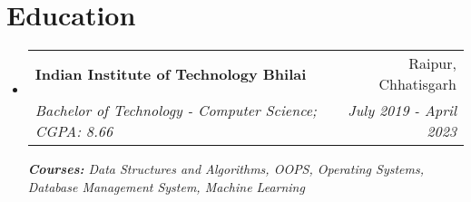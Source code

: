 \documentclass[a4paper,20pt]{article}
\makeatletter
\newcommand{\resumeSubheading}[4]{
  \vspace{-1pt}\item
    \begin{tabular*}{0.97\textwidth}{l@{\extracolsep{\fill}}r}
      \textbf{#1} & #2 \\
      \textit{#3} & \textit{#4} \\
    \end{tabular*}\vspace{-5pt}
}
\newcommand{\resumeSubHeadingListStart}{\begin{itemize}[leftmargin=*]}
\newcommand{\resumeSubHeadingListEnd}{\end{itemize}}
\makeatother
\begin{document}
\vspace{5pt}
\section{Education}
  \resumeSubHeadingListStart
    \resumeSubheading
      {Indian Institute of Technology Bhilai}{Raipur, Chhatisgarh}
      {Bachelor of Technology - Computer Science;  CGPA: 8.66}{July 2019 - April 2023}
      {\scriptsize \textit{ \footnotesize{\newline{}\textbf{Courses:}  Data Structures and Algorithms, OOPS, Operating Systems, Database Management System, Machine Learning}}}
    \resumeSubHeadingListEnd


\end{document}
